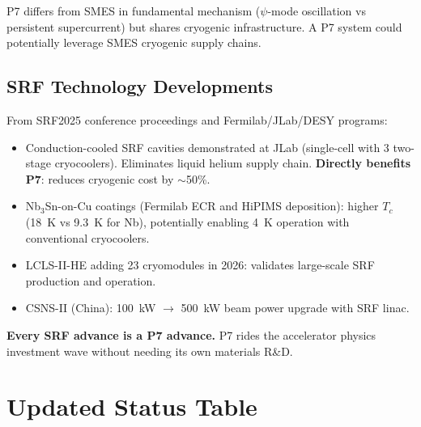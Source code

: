 \documentclass[11pt]{article}
\begin{document}
P7 differs from SMES in fundamental mechanism ($\psi$-mode oscillation
vs persistent supercurrent) but shares cryogenic infrastructure.
A P7 system could potentially leverage SMES cryogenic supply chains.

\subsection{SRF Technology Developments}

From SRF2025 conference proceedings and Fermilab/JLab/DESY programs:
\begin{itemize}
\item Conduction-cooled SRF cavities demonstrated at JLab (single-cell
  with 3 two-stage cryocoolers). Eliminates liquid helium supply chain.
  \textbf{Directly benefits P7}: reduces cryogenic cost by $\sim$50\%.
\item Nb$_3$Sn-on-Cu coatings (Fermilab ECR and HiPIMS deposition):
  higher $T_c$ (18~K vs 9.3~K for Nb), potentially enabling
  4~K operation with conventional cryocoolers.
\item LCLS-II-HE adding 23 cryomodules in 2026: validates large-scale
  SRF production and operation.
\item CSNS-II (China): 100~kW $\to$ 500~kW beam power upgrade with
  SRF linac.
\end{itemize}

\textbf{Every SRF advance is a P7 advance.} P7 rides the accelerator
physics investment wave without needing its own materials R\&D.

\section{Updated Status Table}\label{sec:status}
\end{document}
